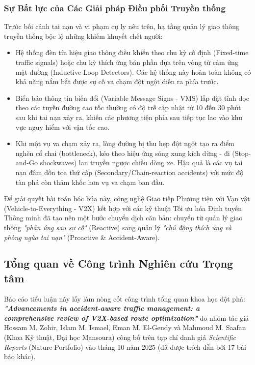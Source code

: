 \documentclass[a4paper]{article}
\begin{document}
\newpage
\subsubsection{Sự Bất lực của Các Giải pháp Điều phối Truyền thống}
Trước bối cảnh tai nạn và vi phạm cự ly nêu trên, hạ tầng quản lý giao thông truyền thống bộc lộ những khiếm khuyết chết người:
\begin{itemize}
    \item Hệ thống đèn tín hiệu giao thông điều khiển theo chu kỳ cố định (Fixed-time traffic signals) hoặc chu kỳ thích ứng bán phần dựa trên vòng từ cảm ứng mặt đường (Inductive Loop Detectors). Các hệ thống này hoàn toàn không có khả năng nắm bắt được sự cố va chạm đột ngột diễn ra phía trước.
    \item Biển báo thông tin biến đổi (Variable Message Signs - VMS) lắp đặt tĩnh dọc theo các tuyến đường cao tốc thường có độ trễ cập nhật từ 10 đến 30 phút sau khi tai nạn xảy ra, khiến các phương tiện phía sau tiếp tục lao vào khu vực nguy hiểm với vận tốc cao.
    \item Khi một vụ va chạm xảy ra, lòng đường bị thu hẹp đột ngột tạo ra điểm nghẽn cổ chai (bottleneck), kéo theo hiệu ứng sóng xung kích dừng - đi (Stop-and-Go shockwaves) lan truyền ngược chiều dòng xe. Hậu quả là các vụ tai nạn đâm dồn toa thứ cấp (Secondary/Chain-reaction accidents) với mức độ tàn phá còn thảm khốc hơn vụ va chạm ban đầu.
\end{itemize}

Để giải quyết bài toán hóc búa này, công nghệ Giao tiếp Phương tiện với Vạn vật (Vehicle-to-Everything - V2X) kết hợp với các kỹ thuật Tối ưu hóa Định tuyến Thông minh đã tạo nên một bước chuyển dịch căn bản: chuyển từ quản lý giao thông \textit{"phản ứng sau sự cố"} (Reactive) sang quản lý \textit{"chủ động thích ứng và phòng ngừa tai nạn"} (Proactive \& Accident-Aware).

\subsection{Tổng quan về Công trình Nghiên cứu Trọng tâm}
Báo cáo tiểu luận này lấy làm nòng cốt công trình tổng quan khoa học đột phá: \textbf{\textit{"Advancements in accident-aware traffic management: a comprehensive review of V2X-based route optimization"}} do nhóm tác giả Hossam M. Zohir, Islam M. Ismael, Eman M. El-Gendy và Mahmoud M. Saafan (Khoa Kỹ thuật, Đại học Mansoura) công bố trên tạp chí danh giá \textit{Scientific Reports} (Nature Portfolio) vào tháng 10 năm 2025 \cite{zohir2025nature} (đã được trích dẫn bởi 17 bài báo khác).
\end{document}
